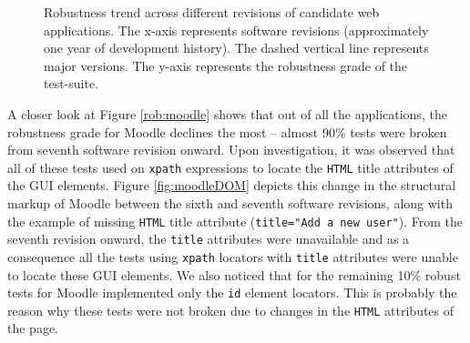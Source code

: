 \begin{figure}[!htbp]
\vspace{-2mm}
  \captionsetup{justification=justified,
singlelinecheck=false}
\caption{Robustness trend across different revisions of candidate web applications. The x-axis represents software revisions (approximately one year of development history). The dashed vertical line represents major versions. The y-axis represents the robustness grade of the test-suite.}
\label{fig:robustnessplots}
\end{figure} 

A closer look at Figure \ref{rob:moodle} shows that out of all the applications, the robustness grade for Moodle declines the most -- almost 90\% tests were broken from seventh software revision onward. Upon investigation, it was observed that all of these tests used on \texttt{xpath} expressions to locate the \texttt{HTML} title attributes of the GUI elements. 
Figure \ref{fig:moodleDOM} depicts this change in the structural markup of Moodle between the sixth and seventh software revisions, along with the example of missing \texttt{HTML} title attribute (\texttt{title="Add a new user"}). From the seventh revision onward, the \texttt{title} attributes were unavailable and as a consequence all the tests using \texttt{xpath} locators with \texttt{title} attributes were unable to locate these GUI elements. 
We also noticed that for the remaining 10\% robust tests for Moodle implemented only the \texttt{id} element locators. This is probably the reason why these tests were not broken due to changes in the \texttt{HTML} attributes of the page.


